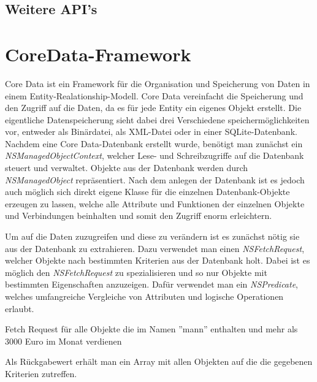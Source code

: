 \subsection{Weitere API's}
\label{sec:technologies:iosandxcode:otherapis}


\section{CoreData-Framework}
\label{sec:technologies:coredata}
Core Data ist ein Framework für die Organisation und Speicherung von Daten in einem Entity-Realationship-Modell.
Core Data vereinfacht die Speicherung und den Zugriff auf die Daten, da es für jede Entity ein eigenes Objekt erstellt.
Die eigentliche Datenspeicherung sieht dabei drei Verschiedene speichermöglichkeiten vor, entweder als Binärdatei, als XML-Datei oder in einer SQLite-Datenbank. 
Nachdem eine Core Data-Datenbank erstellt wurde, benötigt man zunächst ein \emph{NSManagedObjectContext}, welcher Lese- und Schreibzugriffe auf die Datenbank steuert und verwaltet.
Objekte aus der Datenbank werden durch \emph{NSManagedObject} repräsentiert. Nach dem anlegen der Datenbank ist es jedoch auch möglich sich direkt eigene Klasse für die einzelnen Datenbank-Objekte erzeugen zu lassen, welche alle Attribute und Funktionen der einzelnen Objekte und Verbindungen beinhalten und somit den Zugriff enorm erleichtern.

Um auf die Daten zuzugreifen und diese zu verändern ist es zunächst nötig sie aus der Datenbank zu extrahieren. Dazu verwendet man einen \emph{NSFetchRequest}, welcher Objekte nach bestimmten Kriterien aus der Datenbank holt.
Dabei ist es möglich den \emph{NSFetchRequest} zu spezialisieren und so nur Objekte mit bestimmten Eigenschaften anzuzeigen.
Dafür verwendet man ein \emph{NSPredicate}, welches umfangreiche Vergleiche von Attributen und logische Operationen erlaubt.

\begin{listing}[htb! breaklines=true]
    \caption{Fetch Request für alle Objekte die im Namen ''mann'' enthalten und mehr als 3000 Euro im Monat verdienen}
	\label{lst:NSFetchRequest_objc}
\end{listing}

Als Rückgabewert erhält man ein Array mit allen Objekten auf die die gegebenen Kriterien zutreffen.
